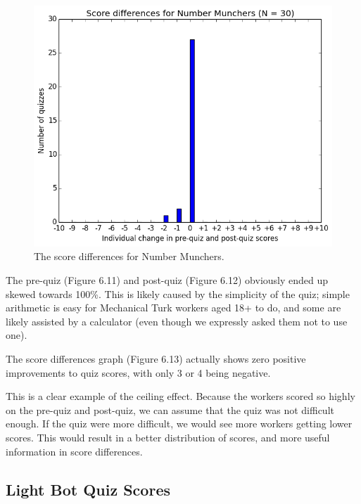 			\begin{figure}[] 
			\centering 
			\includegraphics[width=\textwidth]{munchers_results.png} 
			\caption{The score differences for Number Munchers.}
			\end{figure}

			The pre-quiz (Figure 6.11) and post-quiz (Figure 6.12) obviously ended up skewed towards 100\%. This is likely caused by the simplicity of the quiz; simple arithmetic is easy for Mechanical Turk workers aged 18+ to do, and some are likely assisted by a calculator (even though we expressly asked them not to use one).

			The score differences graph (Figure 6.13) actually shows zero positive improvements to quiz scores, with only 3 or 4 being negative.

			This is a clear example of the ceiling effect. Because the workers scored so highly on the pre-quiz and post-quiz, we can assume that the quiz was not difficult enough. If the quiz were more difficult, we would see more workers getting lower scores. This would result in a better distribution of scores, and more useful information in score differences.

			\clearpage

		\subsection{Light Bot Quiz Scores}

